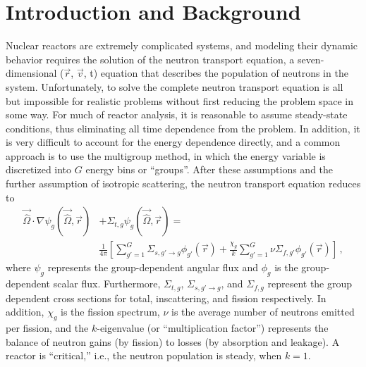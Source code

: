 
\chapter{Introduction and Background} %

\label{Chapter1} %


Nuclear reactors are extremely complicated systems, and modeling their 
dynamic behavior requires the solution of the neutron transport equation, a 
seven-dimensional ($\vec{r}$, $\vec{v}$, t) equation that describes the 
population of neutrons in the system.  Unfortunately, to solve the 
complete neutron transport equation is all but impossible for realistic 
problems 
without first reducing the problem space in some way.  For much of reactor 
analysis, it is reasonable to assume steady-state conditions, thus eliminating 
all time dependence from 
the problem.  In addition, it is very difficult to account for the energy 
dependence directly, and a common approach is to use the multigroup method, 
in which the energy variable is discretized into $G$ energy bins or 
``groups''.  After these assumptions and the further assumption of 
isotropic scattering, the 
neutron transport equation reduces to
\begin{equation}
    \begin{split}
    \vec{\hat{\Omega}}\cdot \nabla \psi_g(\vec{\hat{\Omega}},\vec{r}) 
    &+ \Sigma_{t, g}\psi_g(\vec{\hat{\Omega}},\vec{r}) = \\
    &\frac{1}{4\pi}\left[\sum^G_{g\prime = 1}\Sigma_{s,g\prime\rightarrow 
        g}\phi_{g\prime}(\vec{r}) + \frac{\chi_g}{k}\sum^G_{g\prime = 
        1}\nu\Sigma_{f,g\prime}\phi_{g\prime}(\vec{r})\right] \, ,
    \label{eq:multigroup}
\end{split}
\end{equation}
where $\psi_g$ represents the group-dependent angular flux and $\phi_g$ is the 
group-dependent scalar flux.  Furthermore, $\Sigma_{t,g}$, 
$\Sigma_{s,g\prime \rightarrow g}$, and $\Sigma_{f,g}$ represent the 
group 
dependent cross sections for total, inscattering, and fission respectively.  
In addition, $\chi_g$ is the fission spectrum, $\nu$ is the average number of 
neutrons emitted per fission, and the $k$-eigenvalue (or ``multiplication 
factor'') represents the balance of neutron gains (by fission) to losses (by 
absorption and leakage).  A reactor is ``critical,'' i.e., the neutron 
population is steady, when $k=1$.

